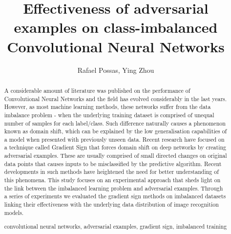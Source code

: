 \documentclass[runningheads,a4paper]{llncs}
\newcommand{\keywords}[1]{\par\addvspace\baselineskip
\noindent\keywordname\enspace\ignorespaces#1}
\begin{document}
\mainmatter  %

\title{Effectiveness of adversarial examples on class-imbalanced Convolutional Neural Networks}

%
%
\author{Rafael Possas, Ying Zhou}
%


%
%

\maketitle


\begin{abstract}
A considerable amount of literature was published on the performance of Convolutional Neural Networks and the field has evolved considerably in the last years. However, as most machine learning methods, these networks suffer from the data imbalance problem - when the underlying training dataset is comprised of unequal number of samples for each label/class. Such difference naturally causes a phenomenon known as domain shift, which can be explained by the low generalisation capabilities of a model when presented with previously unseen data. Recent research have focused on a technique called Gradient Sign that forces domain shift on deep networks by creating adversarial examples. These are usually comprised of small directed changes on original data points that causes inputs to be misclassified by the predictive algorithm. Recent developments in such methods have heightened the need for better understanding of this phenomena. This study focuses on an experimental approach that sheds light on the link between the imbalanced learning problem and adversarial examples. Through a series of experiments we evaluated the gradient sign methods on imbalanced datasets linking their effectiveness with the underlying data distribution of image recognition models.
\keywords{convolutional neural networks, adversarial examples, gradient sign, imbalanced training}
\end{abstract}
\end{document}
